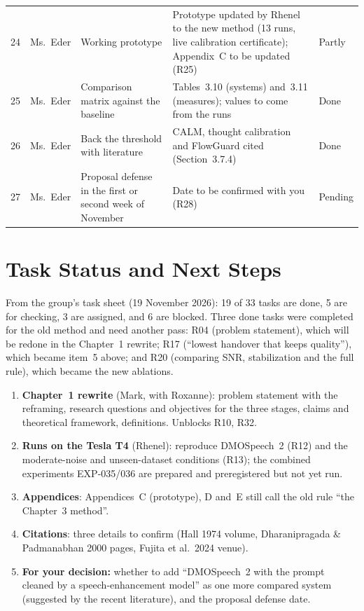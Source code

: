\documentclass[11pt,a4paper]{article}
\newcommand{\st}[1]{\textbf{#1}}
\begin{document}
{\begin{longtable}{@{}P{0.65cm} P{1.95cm} P{3.9cm} P{6.4cm} P{1.3cm}@{}}
24 & Ms.~Eder & Working prototype & Prototype updated by Rhenel to the new method (13 runs, live calibration certificate); Appendix~C to be updated (R25) & Partly \\
25 & Ms.~Eder & Comparison matrix against the baseline & Tables~3.10 (systems) and~3.11 (measures); values to come from the runs & Done \\
26 & Ms.~Eder & Back the threshold with literature & CALM, thought calibration and FlowGuard cited (Section~3.7.4) & Done \\
27 & Ms.~Eder & Proposal defense in the first or second week of November & Date to be confirmed with you (R28) & Pending \\
\end{longtable}
}

\section{Task Status and Next Steps}

From the group's task sheet (19 November 2026): 19 of 33 tasks are done, 5 are for checking, 3 are assigned, and 6 are blocked. Three done tasks were completed for the old method and need another pass: R04 (problem statement), which will be redone in the Chapter~1 rewrite; R17 (``lowest handover that keeps quality''), which became item~5 above; and R20 (comparing SNR, stabilization and the full rule), which became the new ablations.

\begin{enumerate}
\item \st{Chapter~1 rewrite} (Mark, with Roxanne): problem statement with the reframing, research questions and objectives for the three stages, claims and theoretical framework, definitions. Unblocks R10, R32.
\item \st{Runs on the Tesla T4} (Rhenel): reproduce DMOSpeech~2 (R12) and the moderate-noise and unseen-dataset conditions (R13); the combined experiments EXP-035/036 are prepared and preregistered but not yet run.
\item \st{Appendices}: Appendices~C (prototype), D and~E still call the old rule ``the Chapter~3 method''.
\item \st{Citations}: three details to confirm (Hall 1974 volume, Dharanipragada \& Padmanabhan 2000 pages, Fujita et al.\ 2024 venue).
\item \st{For your decision:} whether to add ``DMOSpeech~2 with the prompt cleaned by a speech-enhancement model'' as one more compared system (suggested by the recent literature), and the proposal defense date.
\end{enumerate}
\end{document}
